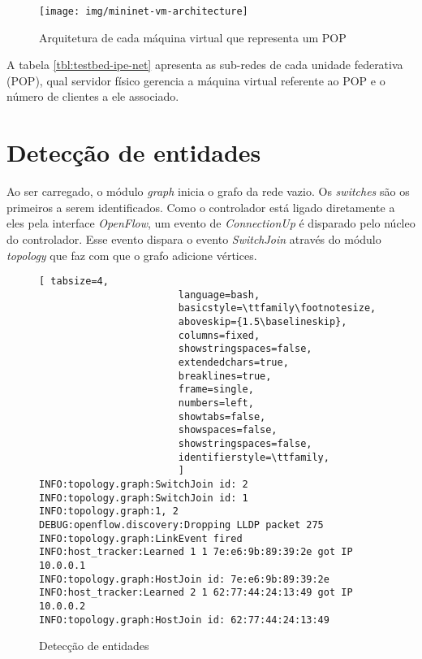 \begin{figure}[h!]
    \centering
    \label{fig:mininet-vm-architecture}
    \texttt{[image: img/mininet-vm-architecture]}
    \caption{Arquitetura de cada máquina virtual que representa um POP}
\end{figure}


A tabela \ref{tbl:testbed-ipe-net} apresenta as sub-redes de cada unidade
federativa (POP), qual servidor físico gerencia a máquina virtual referente
ao POP e o número de clientes a ele associado.




\section{Detecção de entidades}

Ao ser carregado, o módulo \emph{graph} inicia o grafo da rede vazio.
Os \emph{switches} são os primeiros a serem identificados.
Como o controlador está ligado diretamente a eles pela interface
\emph{OpenFlow}, um evento de \emph{ConnectionUp} é disparado
pelo núcleo do controlador.
Esse evento dispara o evento \emph{SwitchJoin} através do módulo
\emph{topology} que faz com que o grafo adicione vértices.

\begin{figure}[h!]
    \centering
    \begin{lstlisting}[ tabsize=4,
                        language=bash,
                        basicstyle=\ttfamily\footnotesize,
                        aboveskip={1.5\baselineskip},
                        columns=fixed,
                        showstringspaces=false,
                        extendedchars=true,
                        breaklines=true,
                        frame=single,
                        numbers=left,
                        showtabs=false,
                        showspaces=false,
                        showstringspaces=false,
                        identifierstyle=\ttfamily,
                        ]
INFO:topology.graph:SwitchJoin id: 2
INFO:topology.graph:SwitchJoin id: 1
INFO:topology.graph:1, 2
DEBUG:openflow.discovery:Dropping LLDP packet 275
INFO:topology.graph:LinkEvent fired
INFO:host_tracker:Learned 1 1 7e:e6:9b:89:39:2e got IP 10.0.0.1
INFO:topology.graph:HostJoin id: 7e:e6:9b:89:39:2e
INFO:host_tracker:Learned 2 1 62:77:44:24:13:49 got IP 10.0.0.2
INFO:topology.graph:HostJoin id: 62:77:44:24:13:49
        \end{lstlisting}
    \caption{Detecção de entidades}
    \label{fig:detection}
\end{figure}

